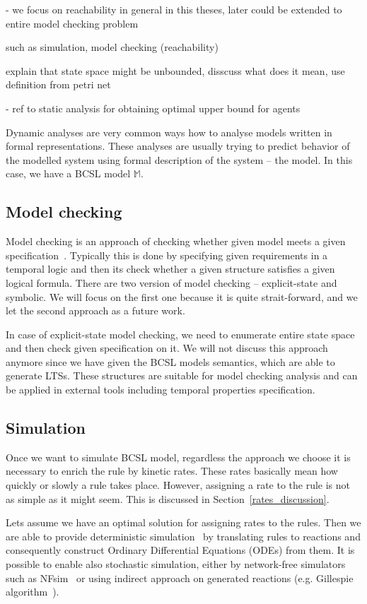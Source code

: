 \documentclass[12pt]{fithesis2}
\begin{document}
 - we focus on reachability in general in this theses, later could be extended to entire model checking problem

such as simulation, model checking (reachability)

explain that state space might be unbounded, disscuss what does it mean, use definition from petri net

 - ref to static analysis for obtaining optimal upper bound for agents

Dynamic analyses are very common ways how to analyse models written in formal representations. These analyses are usually trying to predict behavior of the modelled system using formal description of the system -- the model. In this case, we have a BCSL model $\mathds{M}$. 

\subsection{Model checking}

Model checking is an approach of checking whether given model meets a given specification~\cite{clarke1999model}. Typically this is done by specifying given requirements in a temporal logic and then its check whether a given structure satisfies a given logical formula. There are two version of model checking -- explicit-state and symbolic. We will focus on the first one because it is quite strait-forward, and we let the second approach as a future work.

In case of explicit-state model checking, we need to enumerate entire state space and then check given specification on it. We will not discuss this approach anymore since we have given the BCSL models semantics, which are able to generate LTSs. These structures are suitable for model checking analysis and can be applied in external tools including temporal properties specification.

\subsection{Simulation}
\label{simulation}

Once we want to simulate BCSL model, regardless the approach we choose it is necessary to enrich the rule by kinetic rates. These rates basically mean how quickly or slowly a rule takes place. However, assigning a rate to the rule is not as simple as it might seem. This is discussed in Section~\ref{rates_discussion}.

Lets assume we have an optimal solution for assigning rates to the rules. Then we are able to provide deterministic simulation~\cite{Poole2000} by translating rules to reactions and consequently construct Ordinary Differential Equations (ODEs) from them. It is possible to enable also stochastic simulation, either by network-free simulators such as NFsim~\cite{sneddon2011efficient} or using indirect approach on generated reactions (e.g. Gillespie algorithm~\cite{GILLESPIE1976403}).
\end{document}
